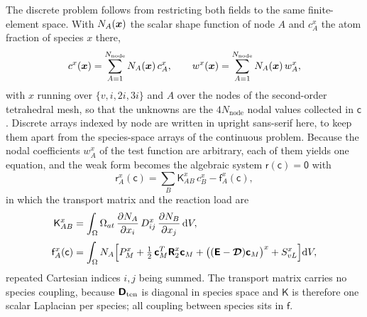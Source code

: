 The discrete problem follows from restricting both fields to the same
finite-element space. With $N_A(\bm{x})$ the scalar shape function of node $A$ and
$c^{x}_{A}$ the atom fraction of species $x$ there,
\begin{equation}
  c^{x}(\bm{x})=\sum_{A=1}^{N_{\mathrm{node}}}N_A(\bm{x})\,c^{x}_{A},
  \qquad
  w^{x}(\bm{x})=\sum_{A=1}^{N_{\mathrm{node}}}N_A(\bm{x})\,w^{x}_{A},
  \label{eq:fe-expansion}
\end{equation}
with $x$ running over $\{v,i,2i,3i\}$ and $A$ over the nodes of the
second-order tetrahedral mesh, so that the unknowns are the
$4N_{\mathrm{node}}$ nodal values collected in $\mathsf c$. Discrete arrays
indexed by node are written in upright sans-serif here, to keep them apart from
the species-space arrays of the continuous problem. Because the nodal
coefficients $w^{x}_{A}$ of the test function are arbitrary, each of them
yields one equation, and the weak form becomes the algebraic system
$\mathsf r(\mathsf c)=\mathsf 0$ with
\begin{equation}
  \mathsf r^{x}_{A}(\mathsf c)
    =\sum_{B}\mathsf K^{x}_{AB}\,c^{x}_{B}-\mathsf f^{x}_{A}(\mathsf c),
  \label{eq:fe-residual}
\end{equation}
in which the transport matrix and the reaction load are
\begin{align}
  \mathsf K^{x}_{AB}
    &=\int_\Omega \Omega_{at}\,
      \frac{\partial N_A}{\partial x_i}\,D^{x}_{ij}\,
      \frac{\partial N_B}{\partial x_j}\,\mathrm dV,
  \label{eq:fe-stiffness}\\[2pt]
  \mathsf f^{x}_{A}(\mathsf c)
    &=\int_\Omega N_A\Bigl[P^{x}_{M}
      +\tfrac12\,\bm{\mathsf{c}}_M^{T}\bm{\mathsf{R}}_2^{x}\bm{\mathsf{c}}_M
      +\bigl((\bm{\mathsf{E}}-\bm{\mathcal{D}})\bm{\mathsf{c}}_M\bigr)^{x}
      +S^{x}_{vL}\Bigr]\mathrm dV,
  \label{eq:fe-load}
\end{align}
repeated Cartesian indices $i,j$ being summed. The transport matrix carries no
species coupling, because $\bm{\mathsf{D}}_{\mathrm{ten}}$ is diagonal in species
space and $\mathsf K$ is therefore one scalar Laplacian per species; all
coupling between species sits in $\mathsf f$.

